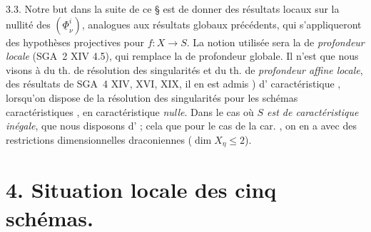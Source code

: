 \documentclass[11pt,a4paper]{article}
\begin{document}
3.3. Notre but dans la suite de ce § est de donner des résultats locaux sur la nullité
des $(\underline{\Phi}^i_\nu)$,  analogues aux résultats globaux précédents,
qui s'appliqueront  \ill{} des hypothèses projectives pour $f : X \to S$. La
notion utilisée sera la  de \emph{profondeur locale} (SGA~2 XIV 4.5),
qui remplace la  de profondeur globale. Il n'est 
\ill{} que nous visons à \ill{}  du th. de résolution des singularités
et du th. de \emph{profondeur affine locale},  
\ill{} des résultats de SGA~4 XIV, XVI, XIX, il en est \ill{} admis \struck{\ill{}})
d' caractéristique , lorsqu'on dispose de la résolution des
singularités pour les schémas \ill{} caractéristiques \struck{\ill{} \ill{}}
\add{\ill{}} \ill{} \ill{},  en caractéristique \emph{nulle}.
Dans le cas où \emph{$S$ est de caractéristique inégale}, \ill{} que nous disposons
\ill{} d' ; cela \ill{} 
 que \ill{} \ill{}  pour le cas de la car.
, on en a  \ill{} avec des restrictions dimensionnelles
draconiennes ($\dim X_\eta \leq 2$).


\section{4.  Situation locale des cinq schémas.}
\end{document}
